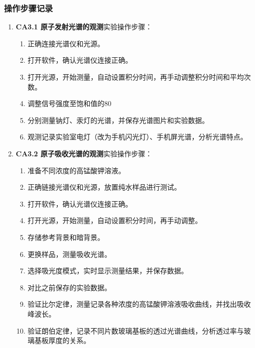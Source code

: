 \documentclass[dvipsnames, svgnames,a4paper,11pt]{article}
\begin{document}
	\subsubsection{操作步骤记录}
	\begin{enumerate}
		\item \textbf{CA3.1 原子发射光谱的观测}实验操作步骤：
		\begin{enumerate}
			\item 正确连接光谱仪和光源。
			\item 打开软件，确认光谱仪连接正确。
			\item 打开光源，开始测量，自动设置积分时间，再手动调整积分时间和平均次数。
			\item 调整信号强度至饱和值的80%
			\item 分别测量钠灯、汞灯的光谱，并保存光谱图片和实验数据。
			\item 观测记录实验室电灯（改为手机闪光灯）、手机屏光谱，分析光谱特点。
		\end{enumerate}
				
		\item \textbf{CA3.2 原子吸收光谱的观测}实验操作步骤：
		\begin{enumerate}
			\item 准备不同浓度的高锰酸钾溶液。
			\item 正确链接光谱仪和光源，放置纯水样品进行测试。
			\item 打开软件，确认光谱仪连接正确。
			\item 打开光源，开始测量，自动设置积分时间，再手动调整。
			\item 存储参考背景和暗背景。
			\item 更换样品，测量吸收光谱。
			\item 选择吸光度模式，实时显示测量结果，并保存数据。
			\item 对比之前保存的实验数据。
			\item 验证比尔定律，测量记录各种浓度的高锰酸钾溶液吸收曲线，并找出吸收峰波长。
			\item 验证朗伯定律，记录不同片数玻璃基板的透过光谱曲线，分析透过率与玻璃基板厚度的关系。
		\end{enumerate}
	\end{enumerate}	
	
\end{document}
